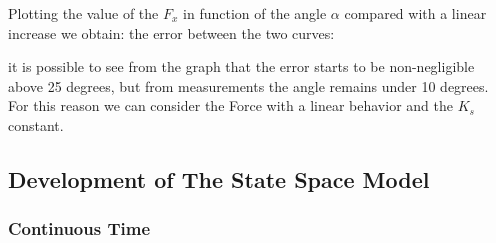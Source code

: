                 Plotting the value of the $F_x$ in function of the angle $\alpha$ compared with a linear increase we obtain:
                the error between the two curves:

                it is possible to see from the graph that the error starts to be non-negligible above 25 degrees, but from measurements the angle remains under 10 degrees. For this reason we can consider the Force with a linear behavior and the $K_s$ constant.

        \subsection{Development of The State Space Model}
            \subsubsection{Continuous Time}

